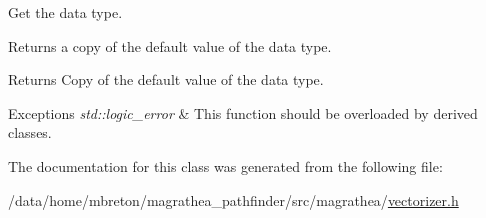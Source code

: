 Get the data type. 

Returns a copy of the default value of the data type. \begin{DoxyReturn}{Returns}
Copy of the default value of the data type. 
\end{DoxyReturn}

\begin{DoxyExceptions}{Exceptions}
{\em std\-::logic\-\_\-error} & This function should be overloaded by derived classes. \\
\hline
\end{DoxyExceptions}


The documentation for this class was generated from the following file\-:\begin{DoxyCompactItemize}
\item 
/data/home/mbreton/magrathea\-\_\-pathfinder/src/magrathea/\hyperlink{vectorizer_8h}{vectorizer.\-h}\end{DoxyCompactItemize}
